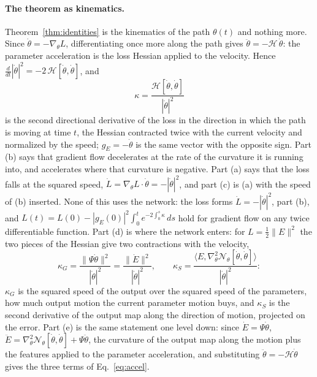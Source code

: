 \documentclass[11pt]{article}
\theoremstyle{definition}
\theoremstyle{remark}
\newcommand{\Net}{\mathcal{N}_\theta}    %
\newcommand{\ip}[2]{\langle #1,#2\rangle}
\newcommand{\Hess}{\mathcal{H}}          %
\begin{document}
\paragraph{The theorem as kinematics.}
Theorem~\ref{thm:identities} is the kinematics of the path $\theta(t)$ and nothing more.
Since $\dot\theta = -\nabla_\theta L$, differentiating once more along the path gives $\ddot\theta = -\Hess\,\dot\theta$: the parameter acceleration is the loss Hessian applied to the velocity.
Hence $\frac{d}{dt}|\dot\theta|^2 = -2\,\Hess[\dot\theta,\dot\theta]$, and
\begin{equation}\label{eq:kappavel}
\kappa = \frac{\Hess[\dot\theta,\dot\theta]}{|\dot\theta|^2}
\end{equation}
is the second directional derivative of the loss in the direction in which the path is moving at time $t$, the Hessian contracted twice with the current velocity and normalized by the speed; $g_E = -\dot\theta$ is the same vector with the opposite sign.
Part (b) says that gradient flow decelerates at the rate of the curvature it is running into, and accelerates where that curvature is negative.
Part (a) says that the loss falls at the squared speed, $\dot L = \nabla_\theta L\cdot\dot\theta = -|\dot\theta|^2$, and part (c) is (a) with the speed of (b) inserted.
None of this uses the network: the loss forms $\dot L = -|\dot\theta|^2$, part (b), and $L(t) = L(0) - |g_E(0)|^2\int_0^te^{-2\int_0^s\kappa}\,ds$ hold for gradient flow on any twice differentiable function.
Part (d) is where the network enters: for $L = \frac12\|E\|^2$ the two pieces of the Hessian give two contractions with the velocity,
\begin{equation}\label{eq:kappavelsplit}
\kappa_G = \frac{\|\Psi\dot\theta\|^2}{|\dot\theta|^2} = \frac{\|\dot E\|^2}{|\dot\theta|^2},\qquad
\kappa_S = \frac{\ip{E}{\nabla^2_\theta\Net[\dot\theta,\dot\theta]}}{|\dot\theta|^2}:
\end{equation}
$\kappa_G$ is the squared speed of the output over the squared speed of the parameters, how much output motion the current parameter motion buys, and $\kappa_S$ is the second derivative of the output map along the direction of motion, projected on the error.
Part (e) is the same statement one level down: since $\dot E = \Psi\dot\theta$, $\ddot E = \nabla^2_\theta\Net[\dot\theta,\dot\theta] + \Psi\ddot\theta$, the curvature of the output map along the motion plus the features applied to the parameter acceleration, and substituting $\ddot\theta = -\Hess\dot\theta$ gives the three terms of Eq.~\eqref{eq:accel}.
\end{document}
